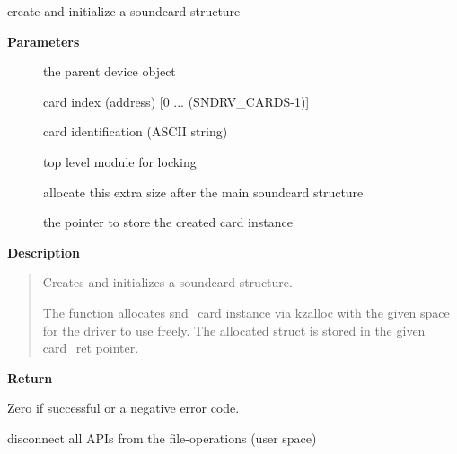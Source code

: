\documentclass[a4paper,8pt,english]{sphinxmanual}
\begin{document}
\begin{fulllineitems}
\label{sound/kernel-api/alsa-driver-api:c.snd_card_new}
create and initialize a soundcard structure

\end{fulllineitems}


\textbf{Parameters}
\begin{description}
\item[{}] \leavevmode
the parent device object

\item[{}] \leavevmode
card index (address) {[}0 ... (SNDRV\_CARDS-1){]}

\item[{}] \leavevmode
card identification (ASCII string)

\item[{}] \leavevmode
top level module for locking

\item[{}] \leavevmode
allocate this extra size after the main soundcard structure

\item[{}] \leavevmode
the pointer to store the created card instance

\end{description}

\textbf{Description}
\begin{quote}

Creates and initializes a soundcard structure.

The function allocates snd\_card instance via kzalloc with the given
space for the driver to use freely.  The allocated struct is stored
in the given card\_ret pointer.
\end{quote}

\textbf{Return}

Zero if successful or a negative error code.

\begin{fulllineitems}
\label{sound/kernel-api/alsa-driver-api:c.snd_card_disconnect}
disconnect all APIs from the file-operations (user space)

\end{fulllineitems}
\end{document}
